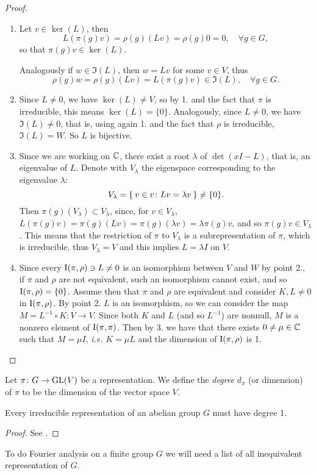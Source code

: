 \begin{proof}~ 
\begin{enumerate}
\item Let $v \in \ker(L)$, then 
\[
L(\pi(g)v)=\rho(g)(Lv)=\rho(g)0=0, \quad \forall g\in G,
\]
so that $\pi(g)v\in \ker(L)$.

Analogously if $w \in \Im(L)$, then $w=Lv$ for some $v\in V$, thus
\[
\rho(g)w=\rho(g)(Lv)=L(\pi(g)v)\in \Im(L), \quad \forall g\in G.
\]


\item Since $L\neq 0$, we have $\ker(L)\neq V$, so by 1. and the fact that $\pi$ is irreducible, this means $\ker(L)=\{0\}$. Analogously, since $L\neq 0$, we have $\Im(L)\neq 0$, that is, using again 1. and the fact that $\rho$ is irreducible, $\Im(L)=W$. So $L$ is bijective.
\item Since we are working on ${\mathbb C}$, there exist a root $\lambda$ of $\det(xI-L)$, that is, an eigenvalue of $L$. Denote with $V_\lambda$ the eigenspace corresponding to the eigenvalue $\lambda$:
\[
V_\lambda=\Set{v\in v \colon Lv=\lambda v}\neq \{0\}.
\] 
Then $\pi(g)(V_\lambda)\subset V_\lambda$, since, for $v\in V_\lambda$, $L(\pi(g)v)=\pi(g)(Lv)=\pi(g)(\lambda  v)=\lambda\pi(g) v$, and so $\pi(g)v\in V_\lambda$. This means that the restriction of $\pi$ to $V_\lambda$ is a subrepresentation of $\pi$, which is irreducible, thus $V_\lambda = V$ and this implies $L=\lambda I$ on $V$. 
\item Since every $\operatorname{I}(\pi,\rho)\ni L\neq 0$ is an isomorphism between $V$ and $W$ by point 2., if $\pi$ and $\rho$ are not equivalent, such an isomorphism cannot exist, and so $\operatorname{I}(\pi,\rho)=\{0\}$. Assume then that $\pi$ and $\rho$ are equivalent and consider $K,L\neq 0$ in  $\operatorname{I}(\pi,\rho)$. By point 2. $L$ is an isomorphism, so we can consider the map $M=L^{-1} \circ K\colon V\rightarrow V$. Since both $K$ and $L$ (and so $L^{-1}$) are nonnull, $M$ is a nonzero element of $\operatorname{I}(\pi,\pi)$. Then by 3. we have that there exists $0\neq \mu\in {\mathbb C}$ such that $M=\mu I$, \emph{i.e.} $K=\mu L$ and the dimension of $\operatorname{I}(\pi,\rho)$ is 1.
\end{enumerate}

\end{proof}
\begin{defn}
Let $\pi\colon G \rightarrow \operatorname{GL}(V)$ be a representation. We define the \emph{degree} $d_{\pi}$ (or dimension) of $\pi$ to be the dimension of the vector space $V$.
\end{defn}
\begin{cor}
Every irreducible representation of an abelian group $G$ must have degree 1.
\end{cor}
\begin{proof}
See \cite[p. 249]{terras_1999}.
\end{proof}
To do Fourier analysis on a finite group $G$ we will need a list of all inequivalent representation of $G$.

